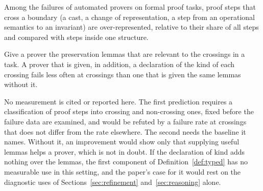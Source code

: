 \begin{prediction}
Among the failures of automated provers on formal proof tasks, proof steps that cross a
boundary (a cast, a change of representation, a step from an operational semantics to an
invariant) are over-represented, relative to their share of all steps and compared with
steps inside one structure.
\end{prediction}

\begin{prediction}
Give a prover the preservation lemmas that are relevant to the crossings in a task. A
prover that is given, in addition, a declaration of the kind of each crossing fails
less often at crossings than one that is given the same lemmas without it.
\end{prediction}

No measurement is cited or reported here. The first prediction requires a classification
of proof steps into crossing and non-crossing ones, fixed before the failure data are
examined, and would be refuted by a failure rate at crossings that does not differ from
the rate elsewhere. The second needs the baseline it names. Without it, an improvement
would show only that supplying useful lemmas helps a prover, which is not in doubt. If
the declaration of kind adds nothing over the lemmas, the first component of
Definition~\ref{def:typed} has no measurable use in this setting, and the paper's case
for it would rest on the diagnostic uses of Sections~\ref{sec:refinement}
and~\ref{sec:reasoning} alone.

